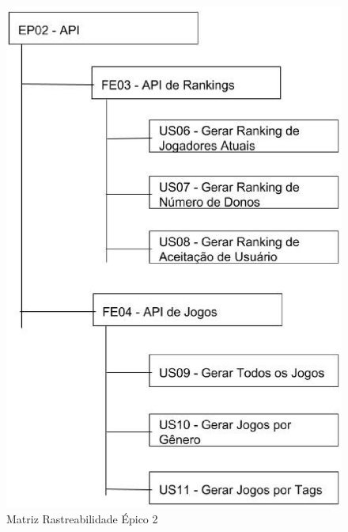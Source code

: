 \begin{figure}
\centering
\includegraphics[scale=0.35]{figuras/EP02.eps}
\caption{Matriz Rastreabilidade Épico 2}
\label{image:ep02}
\end{figure}
